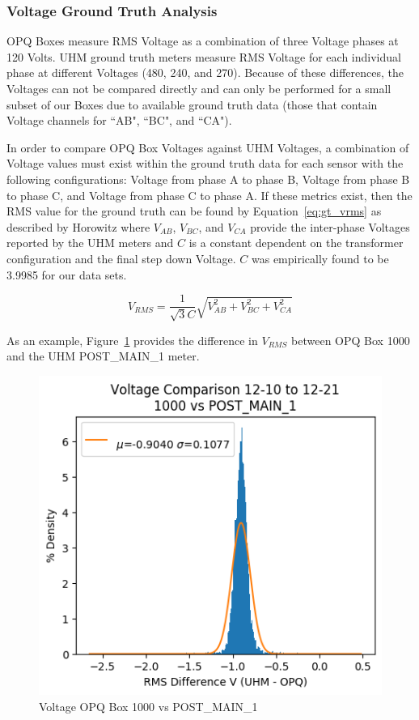 \subsubsection{Voltage Ground Truth Analysis}

OPQ Boxes measure RMS Voltage as a combination of three Voltage phases at 120 Volts. UHM ground truth meters measure RMS Voltage for each individual phase at different Voltages (480, 240, and 270). Because of these differences, the Voltages can not be compared directly and can only be performed for a small subset of our Boxes due to available ground truth data (those that contain Voltage channels for ``AB", ``BC", and ``CA").

In order to compare OPQ Box Voltages against UHM Voltages, a combination of Voltage values must exist within the ground truth data for each sensor with the following configurations: Voltage from phase A to phase B, Voltage from phase B to phase C, and Voltage from phase C to phase A. If these metrics exist, then the RMS value for the ground truth can be found by Equation~\ref{eq:gt_vrms} as described by Horowitz\cite{Horowitz:2015:AE:2960712} where $V_{AB}$, $V_{BC}$, and $V_{CA}$ provide the inter-phase Voltages reported by the UHM meters and $C$ is a constant dependent on the transformer configuration and the final step down Voltage. $C$ was empirically found to be 3.9985 for our data sets.

\begin{equation}
    V_{RMS} = \frac{1}{\sqrt{3}C} \sqrt{V_{AB}^2 + V_{BC}^2 + V_{CA}^2}
    \label{eq:gt_vrms}
\end{equation}

As an example, Figure~\ref{fig:v_hist} provides the difference in $V_{RMS}$ between OPQ Box 1000 and the UHM POST\_MAIN\_1 meter.

\begin{figure}[H]
    \centering
    \includegraphics[width=0.75\linewidth]{figures/v_hist_1000_POST_MAIN_1.png}
    \caption{Voltage OPQ Box 1000 vs POST\_MAIN\_1}
    \label{fig:v_hist}
\end{figure}

